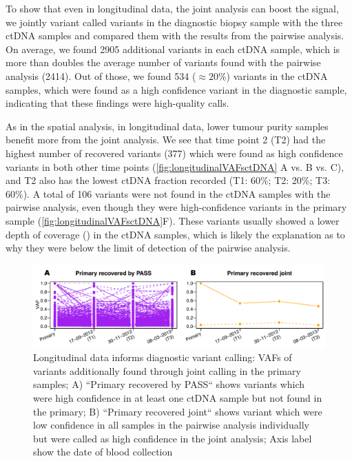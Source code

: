 To show that even in longitudinal data, the joint analysis can boost the signal, we jointly variant called variants in the diagnostic biopsy sample with the three ctDNA samples and compared them with the results from the pairwise analysis. On average, we found 2905 additional variants in each  ctDNA sample, which is more than doubles the average number of variants found with the pairwise analysis (2414). Out of those, we found 534 ($\approx 20\%$) variants in the ctDNA samples, which were found as a high confidence variant in the diagnostic sample, indicating that these findings were high-quality calls. 

As in the spatial analysis, in longitudinal data, lower tumour purity samples benefit more from the joint analysis. We see that time point 2 (T2) had the highest number of recovered variants (377) which were found as high confidence variants in both other time points (\autoref{fig:longitudinalVAFsctDNA} A vs. B vs. C), and T2 also has the lowest ctDNA fraction recorded (T1: 60\%; T2: 20\%; T3: 60\%). A total of 106 variants were not found in the ctDNA samples with the pairwise analysis, even though they were high-confidence variants in the primary sample (\autoref{fig:longitudinalVAFsctDNA}F). These variants usually showed a lower depth of coverage () in the ctDNA samples, which is likely the explanation as to why they were below the limit of detection of the pairwise analysis. 

\begin{figure}[ht]
\centering
\includegraphics[width=.99\linewidth]{Figures/jointVariantCalling/longitudinalCA9primaryVafs.pdf}
\caption[Longitudinal data informs diagnostic variant calling]{Longitudinal data informs diagnostic variant calling: VAFs of variants additionally found through joint calling in the primary samples; A) ``Primary recovered by PASS`` shows variants which were high confidence in at least one ctDNA sample but not found in the primary; B) ``Primary recovered joint`` shows variant which were low confidence in all samples in the pairwise analysis individually but were called as high confidence in the joint analysis; Axis label show the date of blood collection}\label{fig:longitudinalVAFsprimary}
\end{figure}

